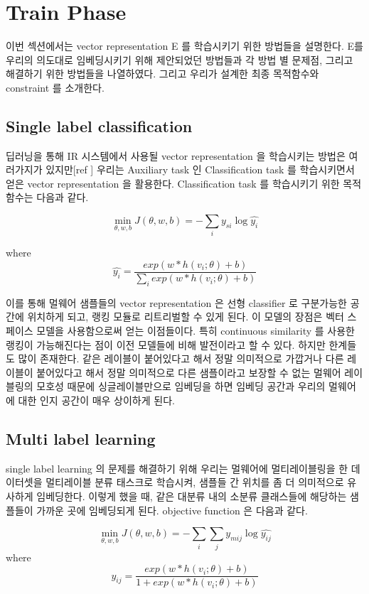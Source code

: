 \section{Train Phase}
이번 섹션에서는 vector representation E 를 학습시키기 위한 방법들을 설명한다. E를 우리의 의도대로 임베딩시키기 위해 제안되었던 방법들과 각 방법 별 문제점, 그리고 해결하기 위한 방법들을 나열하였다. 그리고 우리가 설계한 최종 목적함수와 constraint 를 소개한다. 


\subsection{Single label classification}
 딥러닝을 통해 IR 시스템에서 사용될 vector representation 을 학습시키는 방법은 여러가지가 있지만[ref ] 우리는 Auxiliary task 인 Classification task 를 학습시키면서 얻은 vector representation 을 활용한다. Classification task 를 학습시키기 위한 목적함수는 다음과 같다.

\begin{equation}
\label{eqn:01}
\min_{\theta,w,b} J(\theta, w, b) = -\sum_i{y_{si} \log{\hat{y_i}}}
\end{equation}

where 
\[
\hat{y_i} = \frac{exp(w*h(v_i;\theta)+b)}{\sum_i{exp(w*h(v_i;\theta)+b)}}
\]

 이를 통해 멀웨어 샘플들의 vector representation 은 선형 classifier 로 구분가능한 공간에 위치하게 되고, 랭킹 모듈로 리트리벌할 수 있게 된다. 이 모델의 장점은 벡터 스페이스 모델을 사용함으로써 얻는 이점들이다. 특히 continuous similarity 를 사용한 랭킹이 가능해진다는 점이 이전 모델들에 비해 발전이라고 할 수 있다. 하지만 한계들도 많이 존재한다. 같은 레이블이 붙어있다고 해서 정말 의미적으로 가깝거나 다른 레이블이 붙어있다고 해서 정말 의미적으로 다른 샘플이라고 보장할 수 없는 멀웨어 레이블링의 모호성 때문에 싱글레이블만으로 임베딩을 하면 임베딩 공간과 우리의 멀웨어에 대한 인지 공간이 매우 상이하게 된다. 


\subsection{Multi label learning}
single label learning 의 문제를 해결하기 위해 우리는 멀웨어에 멀티레이블링을 한 데이터셋을 멀티레이블 분류 태스크로 학습시켜, 샘플들 간 위치를 좀 더 의미적으로 유사하게 임베딩한다. 이렇게 했을 때, 같은 대분류 내의 소분류 클래스들에 해당하는 샘플들이 가까운 곳에 임베딩되게 된다. objective function 은 다음과 같다. 

\begin{equation}
\label{eqn:02}
\min_{\theta,w,b} J(\theta, w, b) = -\sum_i{ \sum_j{ y_{mij} \log{\hat{y_{ij}}}}}
\end{equation}
where  
\[
\hat{y_{ij}} = \frac{exp(w*h(v_i;\theta)+b)}{ 1 + exp(w*h(v_i;\theta)+b)}
\]

